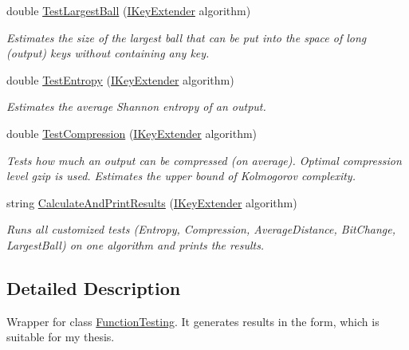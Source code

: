 \begin{DoxyCompactItemize}
double \hyperlink{class_crypto_1_1_function_tests_for_thesis_af91fad42f0f9f07c9856159e8a77efcf}{Test\+Largest\+Ball} (\hyperlink{interface_crypto_1_1_i_key_extender}{I\+Key\+Extender} algorithm)
\begin{DoxyCompactList}\small\item\em Estimates the size of the largest ball that can be put into the space of long (output) keys without containing any key. \end{DoxyCompactList}\item 
double \hyperlink{class_crypto_1_1_function_tests_for_thesis_a286fefd74161e48ca2bc1d1c84134f74}{Test\+Entropy} (\hyperlink{interface_crypto_1_1_i_key_extender}{I\+Key\+Extender} algorithm)
\begin{DoxyCompactList}\small\item\em Estimates the average Shannon entropy of an output. \end{DoxyCompactList}\item 
double \hyperlink{class_crypto_1_1_function_tests_for_thesis_aa8d949ca13be79e8f42b441dbf2faf11}{Test\+Compression} (\hyperlink{interface_crypto_1_1_i_key_extender}{I\+Key\+Extender} algorithm)
\begin{DoxyCompactList}\small\item\em Tests how much an output can be compressed (on average). Optimal compression level gzip is used. Estimates the upper bound of Kolmogorov complexity. \end{DoxyCompactList}\item 
string \hyperlink{class_crypto_1_1_function_tests_for_thesis_ae61b66d865e06140e6b6b58d14e0790e}{Calculate\+And\+Print\+Results} (\hyperlink{interface_crypto_1_1_i_key_extender}{I\+Key\+Extender} algorithm)
\begin{DoxyCompactList}\small\item\em Runs all customized tests (Entropy, Compression, Average\+Distance, Bit\+Change, Largest\+Ball) on one algorithm and prints the results. \end{DoxyCompactList}\end{DoxyCompactItemize}


\subsection{Detailed Description}
Wrapper for class {\ttfamily \hyperlink{class_crypto_1_1_function_testing}{Function\+Testing}}. It generates results in the form, which is suitable for my thesis. 



